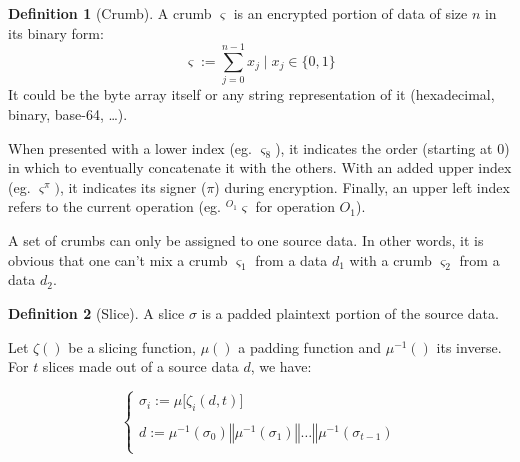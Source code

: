 \documentclass[twoside,twocolumn]{article}
\theoremstyle{definition}
\newtheorem{definition}{Definition}
\theoremstyle{remark}
\begin{document}
\begin{definition}[Crumb]
    \label{crumb}
    A crumb $\varsigma$ is an encrypted portion of data of size $n$ in its binary form:
    \begin{equation}
        \label{eq:crumb}
        \varsigma := \sum_{j=0}^{n-1} x_j \mid x_j \in \{ 0, 1 \}
    \end{equation}
    It could be the byte array itself or any string representation of it (hexadecimal, binary, base-64, \dots).

    When presented with a lower index (eg. $\varsigma_8$), it indicates the order (starting at $0$) in which to eventually concatenate it with the 
    others. With an added upper index (eg. $\varsigma^\pi)$, it indicates its signer ($\pi$) during encryption. Finally, an upper left index refers to 
    the current operation (eg. ${}^{O_1}\varsigma$ for operation $O_1$).

    A set of crumbs can only be assigned to one source data. In other words, it is obvious that one can't mix a crumb $\varsigma_1$ from a data $d_1$ 
    with a crumb $\varsigma_2$ from a data $d_2$.
\end{definition}

\begin{definition}[Slice]
    \label{slice}
    A slice $\sigma$ is a padded plaintext portion of the source data.

    Let $\zeta()$ be a slicing function, $\mu()$ a padding function and $\mu^{-1}()$ its inverse. For $t$ slices made out of a source data $d$, we have:
    \begin{small}
        \begin{equation}
            \label{eq:slice}
            \left\{
                \begin{array}{l}
                    \sigma_i := \mu \Big[ \zeta_i(d, t) \Big] \\ \\
                    d := \mu^{-1}(\sigma_0) \mathbin\Vert \mu^{-1}(\sigma_1) \mathbin\Vert \dots \mathbin\Vert \mu^{-1}(\sigma_{t-1}) \\
                \end{array}
            \right.
        \end{equation}
    \end{small}
\end{definition}

\end{document}

